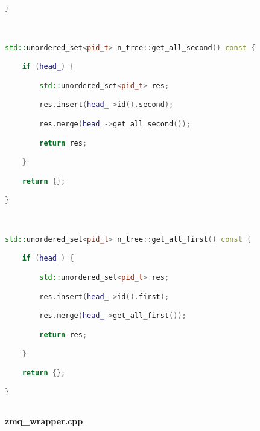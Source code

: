 \begin{lstlisting}[language=C++]
}



std::unordered_set<pid_t> n_tree::get_all_second() const {

    if (head_) {

        std::unordered_set<pid_t> res;

        res.insert(head_->id().second);

        res.merge(head_->get_all_second());

        return res;

    }

    return {};

}



std::unordered_set<pid_t> n_tree::get_all_first() const {

    if (head_) {

        std::unordered_set<pid_t> res;

        res.insert(head_->id().first);

        res.merge(head_->get_all_first());

        return res;

    }

    return {};

}



\end{lstlisting}

\textbf{zmq\_wrapper.cpp}


